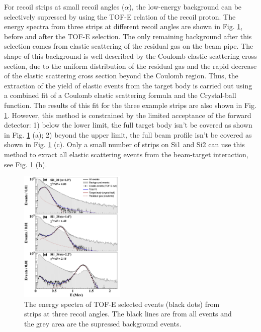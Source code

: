\documentclass[fleqn,twocolumn,a4paper]{ikpar}
\begin{document}
For recoil strips at small recoil angles ($\alpha$), the low-energy background
can be selectively supressed by using the TOF-E relation of the recoil proton.
The energy spectra from three strips at different recoil angles are shown in
Fig. \ref{fig:coulomb_cb2_fit},  before and after the TOF-E selection.
The only remaining background after this selection comes from elastic scattering of the residual gas on the beam pipe.
The shape of this background is well described by the Coulomb elastic scattering cross
section, due to the uniform distribution of the residual gas \cite{r2} and the
rapid decrease of the elastic scattering cross section beyond the Coulomb region.
Thus, the extraction of the yield of elastic events from the target body is carried out
using a combined fit of a Coulomb elastic scattering formula and the Crystal-ball
function.
The results of this fit for the three example strips are also shown in Fig. \ref{fig:coulomb_cb2_fit}.
However, this method is constrained by the limited acceptance of the forward detector:
1) below the lower limit, the full target body isn't be covered as shown in Fig.
\ref{fig:coulomb_cb2_fit} (a);
2) beyond the upper limit, the full beam profile isn't be covered as shown in
Fig. \ref{fig:coulomb_cb2_fit} (c).
Only a small number of strips on Si1 and Si2 can use this method to exract all
elastic scattering events from the beam-target interaction, see Fig. \ref{fig:coulomb_cb2_fit} (b).
\begin{figure}[!htb]
	\includegraphics[width=0.45\textwidth]{./coulomb_cb2_fit.png}
  \caption{The energy spectra of TOF-E selected events (black dots) from strips at three
    recoil angles. The black lines are from all events and the grey area are the
  supressed background events. }
  \label{fig:coulomb_cb2_fit}
\end{figure}
\end{document}
